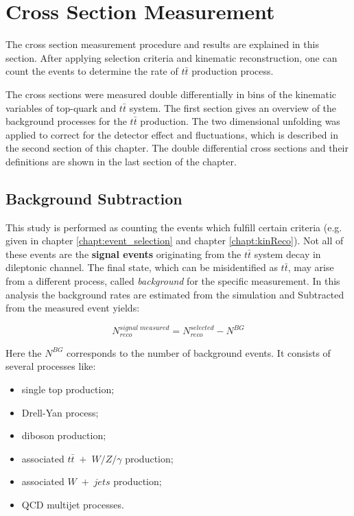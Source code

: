 \chapter{Cross Section Measurement}

The cross section measurement procedure and results are explained in this section.
After applying selection criteria and kinematic reconstruction, one can count the events to determine
the rate of $t\bar{t}$ production process.

The cross sections were measured double differentially in bins of the kinematic variables of top-quark and $t\bar{t}$ system.
The first section gives an overview of the background processes for the $t\bar{t}$ production.
The two dimensional unfolding was applied to correct for the detector effect and fluctuations, which is described
in the second section of this chapter.
The double differential cross sections and their definitions are shown in the last section of the chapter.

\section{Background Subtraction}
This study is performed as counting the events which fulfill certain criteria (e.g. given in chapter \ref{chapt:event_selection} and 
chapter \ref{chapt:kinReco}). Not all of these events are the \textbf{signal events} originating from the $t\bar{t}$ system decay in dileptonic
channel. The final state, which can be misidentified as $t\bar{t}$, may arise from a different process, called \textit{background}
for the specific measurement. In this analysis the background rates are estimated from the simulation and Subtracted 
from the measured event yields:

\begin{equation}\label{eq:bgsub}
 N^{signal\;measured}_{reco} = N^{selected}_{reco} - N^{BG}
\end{equation}

Here the $N^{BG}$ corresponds to the number of background events. It consists of several processes like:

\begin{itemize}
 \item single top production;
 \item Drell-Yan process;
 \item diboson production;
 \item associated $t\bar{t}\;+\; W/Z/\gamma$ production;
 \item associated $W\;+\;jets$ production;
 \item QCD multijet processes.
\end{itemize}

